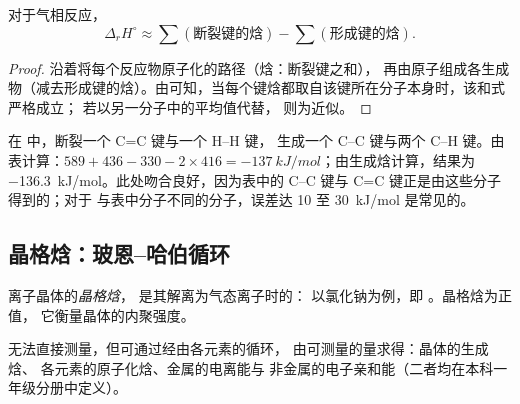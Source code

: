 \begin{proposition}[由键焓估算]\label{prop:b2:reaction-enthalpy:bond-estimate}
对于气相反应，
\[
  \Delta_r H^\circ \approx \sum(\text{断裂键的焓}) -
  \sum(\text{形成键的焓}).
\]
\end{proposition}

\begin{proof}
沿着将每个反应物原子化的路径（焓：断裂键之和），
再由原子组成各生成物（减去形成键的焓）。由可知，当每个键焓都取自该键所在分子本身时，该和式严格成立；
若以另一分子中的平均值代替，
则为近似。
\end{proof}

\begin{example}[乙烯加氢]\label{ex:b2:reaction-enthalpy:hydrogenation}
在  中，断裂一个 C=C 键与一个 H--H 键，
生成一个 C--C 键与两个 C--H 键。由表计算：$589 + 436 - 330 - 2
\times 416 = \qty{-137}{kJ/mol}$；由生成焓计算，结果为
\qty{-136.3}{kJ/mol}。此处吻合良好，因为表中的 C--C
键与 C=C 键正是由这些分子得到的；对于
与表中分子不同的分子，误差达 10 至 \qty{30}{kJ/mol} 是常见的。
\end{example}

\subsection*{晶格焓：玻恩–哈伯循环}

\begin{definition}[晶格焓]\label{def:b2:reaction-enthalpy:lattice-enthalpy}
离子晶体的\emph{晶格焓}，
是其解离为气态离子时的：
以氯化钠为例，即 。晶格焓为正值，
它衡量晶体的内聚强度。
\end{definition}

无法直接测量，但可通过经由各元素的循环，
由可测量的量求得：晶体的生成焓、
各元素的原子化焓、金属的电离能与
非金属的电子亲和能（二者均在本科一年级分册中定义）。

